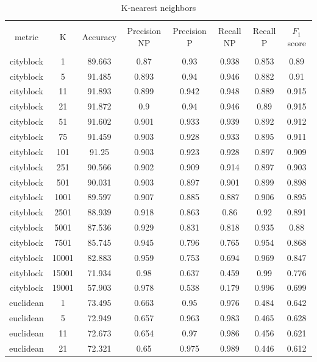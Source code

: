 \documentclass[journal,twocolumn]{IEEEtran}
\begin{document}
\begin{appendices}
\begin{table}[H]
\caption{K-nearest neighbors}
\centering
\begin{tabular}{cccccccc}
\hline\\ [-1.5ex]
metric &    K & Accuracy & Precision NP & Precision P & Recall NP & Recall P & $F_1$ score\\ \hline\\ [-1.5ex]
 cityblock &     1 &  89.663 &  0.87 &  0.93 & 0.938 & 0.853 &  0.89\\
 cityblock &     5 &  91.485 & 0.893 &  0.94 & 0.946 & 0.882 &  0.91\\
 cityblock &    11 &  91.893 & 0.899 & 0.942 & 0.948 & 0.889 & 0.915\\
 cityblock &    21 &  91.872 &   0.9 &  0.94 & 0.946 &  0.89 & 0.915\\
 cityblock &    51 &  91.602 & 0.901 & 0.933 & 0.939 & 0.892 & 0.912\\
 cityblock &    75 &  91.459 & 0.903 & 0.928 & 0.933 & 0.895 & 0.911\\
 cityblock &   101 &   91.25 & 0.903 & 0.923 & 0.928 & 0.897 & 0.909\\
 cityblock &   251 &  90.566 & 0.902 & 0.909 & 0.914 & 0.897 & 0.903\\
 cityblock &   501 &  90.031 & 0.903 & 0.897 & 0.901 & 0.899 & 0.898\\
 cityblock &  1001 &  89.597 & 0.907 & 0.885 & 0.887 & 0.906 & 0.895\\
 cityblock &  2501 &  88.939 & 0.918 & 0.863 &  0.86 &  0.92 & 0.891\\
 cityblock &  5001 &  87.536 & 0.929 & 0.831 & 0.818 & 0.935 &  0.88\\
 cityblock &  7501 &  85.745 & 0.945 & 0.796 & 0.765 & 0.954 & 0.868\\
 cityblock & 10001 &  82.883 & 0.959 & 0.753 & 0.694 & 0.969 & 0.847\\
 cityblock & 15001 &  71.934 &  0.98 & 0.637 & 0.459 &  0.99 & 0.776\\
 cityblock & 19001 &  57.903 & 0.978 & 0.538 & 0.179 & 0.996 & 0.699\\\hline
 euclidean &     1 &  73.495 & 0.663 &  0.95 & 0.976 & 0.484 & 0.642\\
 euclidean &     5 &  72.949 & 0.657 & 0.963 & 0.983 & 0.465 & 0.628\\
 euclidean &    11 &  72.673 & 0.654 &  0.97 & 0.986 & 0.456 & 0.621\\
 euclidean &    21 &  72.321 &  0.65 & 0.975 & 0.989 & 0.446 & 0.612\\

\end{tabular}
\end{table}
\end{appendices}
\end{document}
